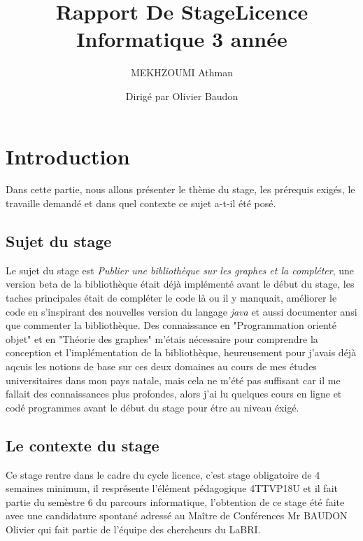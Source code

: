\documentclass[12pt]{article}
\title{Rapport De Stage} %
\title{Licence Informatique 3\up{ème} année}
\author{MEKHZOUMI Athman} %
\author{Dirigé par Olivier Baudon}
\begin{document}
\newpage
\maketitle
\tableofcontents
\newpage

\section{Introduction}

Dans cette partie, nous allons présenter le thème du stage, les prérequis exigés, le travaille demandé et dans quel contexte ce sujet a-t-il été posé.

\newline %
\subsection{Sujet du stage}

Le sujet du stage est \textit{Publier une bibliothèque sur les graphes et la compléter}, une version beta de la bibliothèque était déjà implémenté avant le début du stage, les taches principales était de compléter le code là ou il y manquait, améliorer le code en s'inspirant des nouvelles version du langage \textit{java} et aussi documenter ansi que commenter la bibliothèque.
\newline Des connaissance en "Programmation orienté objet" et en "Théorie des graphes" m'étais nécessaire pour comprendre la conception et l'implémentation de la bibliothèque, heureusement pour j'avais déjà aqcuis les notions de base sur ces deux domaines au cours de mes études universitaires dans mon pays natale, mais cela ne m'été pas suffisant car il me fallait des connaissances plus profondes, alors j'ai lu quelques cours en ligne et codé programmes avant le début du stage pour étre au niveau éxigé. 

\newline %
\subsection{Le contexte du stage}

Ce stage rentre dans le cadre du cycle licence, c'est stage obligatoire de 4 semaines minimum, il resprésente l'élément pédagogique 4TTVP18U et il fait partie du semèstre 6 du parcours informatique, l'obtention de ce stage été faite avec une candidature spontané adressé au Maître de Conférences Mr BAUDON Olivier qui fait partie de l'équipe des chercheurs du LaBRI.
\end{document}
